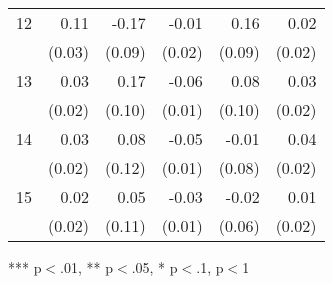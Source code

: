 \begin{tabular}{llllll}
\multicolumn{1}{l}{12} &
  \multicolumn{1}{|r}{0.11} &
  \multicolumn{1}{r}{-0.17} &
  \multicolumn{1}{r}{-0.01} &
  \multicolumn{1}{r}{0.16} &
  \multicolumn{1}{r}{0.02} \\
\multicolumn{1}{l}{} &
  \multicolumn{1}{|r}{(0.03)} &
  \multicolumn{1}{r}{(0.09)} &
  \multicolumn{1}{r}{(0.02)} &
  \multicolumn{1}{r}{(0.09)} &
  \multicolumn{1}{r}{(0.02)} \\
\multicolumn{1}{l}{13} &
  \multicolumn{1}{|r}{0.03} &
  \multicolumn{1}{r}{0.17} &
  \multicolumn{1}{r}{-0.06} &
  \multicolumn{1}{r}{0.08} &
  \multicolumn{1}{r}{0.03} \\
\multicolumn{1}{l}{} &
  \multicolumn{1}{|r}{(0.02)} &
  \multicolumn{1}{r}{(0.10)} &
  \multicolumn{1}{r}{(0.01)} &
  \multicolumn{1}{r}{(0.10)} &
  \multicolumn{1}{r}{(0.02)} \\
\multicolumn{1}{l}{14} &
  \multicolumn{1}{|r}{0.03} &
  \multicolumn{1}{r}{0.08} &
  \multicolumn{1}{r}{-0.05} &
  \multicolumn{1}{r}{-0.01} &
  \multicolumn{1}{r}{0.04} \\
\multicolumn{1}{l}{} &
  \multicolumn{1}{|r}{(0.02)} &
  \multicolumn{1}{r}{(0.12)} &
  \multicolumn{1}{r}{(0.01)} &
  \multicolumn{1}{r}{(0.08)} &
  \multicolumn{1}{r}{(0.02)} \\
\multicolumn{1}{l}{15} &
  \multicolumn{1}{|r}{0.02} &
  \multicolumn{1}{r}{0.05} &
  \multicolumn{1}{r}{-0.03} &
  \multicolumn{1}{r}{-0.02} &
  \multicolumn{1}{r}{0.01} \\
\multicolumn{1}{l}{} &
  \multicolumn{1}{|r}{(0.02)} &
  \multicolumn{1}{r}{(0.11)} &
  \multicolumn{1}{r}{(0.01)} &
  \multicolumn{1}{r}{(0.06)} &
  \multicolumn{1}{r}{(0.02)} \\
\cline{1-6}
\end{tabular}

\footnotesize{
*** p$<$.01, ** p$<$.05, * p$<$.1,  p$<$1
}
